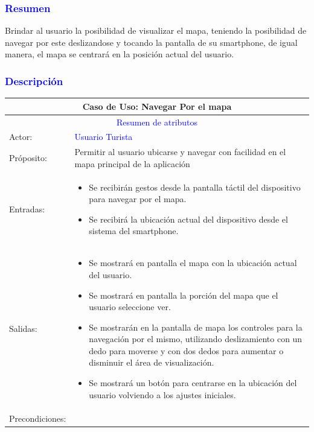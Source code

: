 \subsubsection{\textcolor{blue}{Resumen}}
Brindar al usuario la posibilidad de visualizar el mapa, teniendo la posibilidad de navegar por este deslizandose y tocando la pantalla de su smartphone, de igual manera, el mapa se centrará en la posición actual del usuario. 
\subsubsection{\textcolor{blue}{Descripción}}
\begin{tabularx}{16cm}{||l|X||}
	\hline
	\multicolumn{2}{||c||}{Caso de Uso: Navegar Por el mapa }  \\
	\hline
	\multicolumn{2}{||c||}{\textcolor{blue}{Resumen de atributos}} \\
	\hline
	{Actor:} & {\textcolor{blue}{Usuario Turista}} \\
	\hline
	{Próposito:} & { Permitir al usuario ubicarse y navegar con facilidad en el mapa principal de la aplicación} \\
	\hline
	{Entradas:} & {\begin{itemize}
            \item  Se recibirán gestos desde la pantalla táctil del dispositivo para navegar por el mapa.
            \item Se recibirá la ubicación actual del dispositivo desde el sistema del smartphone.
        \end{itemize}}\\
	\hline
	{Salidas:} & {\begin{itemize}
            \item Se mostrará en pantalla el mapa con la ubicación actual del usuario.
            \item  Se mostrará en pantalla la porción del mapa que el usuario seleccione ver.
            \item Se mostrarán en la pantalla de mapa los controles para la navegación por el mismo, utilizando deslizamiento con un dedo para moverse y con dos dedos para aumentar o disminuir el área de visualización.
            \item Se mostrará un botón para centrarse en la ubicación del usuario volviendo a los ajustes iniciales. 
        \end{itemize}}\\
	\hline
	{Precondiciones:} & { \begin{itemize}

\end{itemize}}
\end{tabularx}
